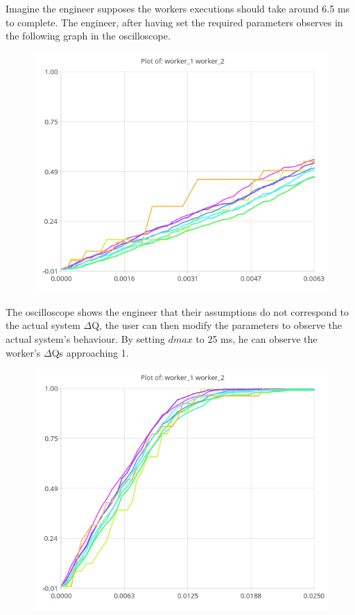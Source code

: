         Imagine the engineer supposes the workers executions should take around 6.5 ms to complete. The engineer, after having set the required parameters observes in the following graph in the oscilloscope.

        \begin{figure}[H]
            \begin{center}
                \includegraphics[scale=0.6]{img/w1w2.png}
            \end{center}
        \end{figure}
    The oscilloscope shows the engineer that their assumptions do not correspond to the actual system $\Delta$Q, the user can then modify the parameters to observe the actual system's behaviour. By setting $dmax$ to 25 ms, he can observe the worker's $\Delta$Qs approaching 1.
        \begin{figure}[H]
            \begin{center}
                \includegraphics[scale=0.6]{img/w1w2hb.png}
            \end{center}
        \end{figure}

